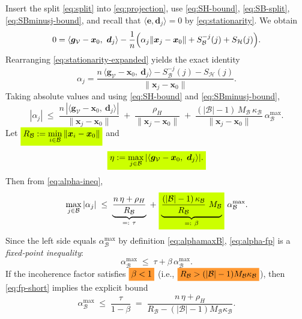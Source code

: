 \documentclass{article}
\theoremstyle{plain}
\theoremstyle{definition}
\theoremstyle{remark}
\begin{document}
Insert the split \eqref{eq:split} into \eqref{eq:projection}, use \eqref{eq:SH-bound}, \eqref{eq:SB-split}, \eqref{eq:SBminusj-bound}, and recall that $\langle \bm{e},\bm{d}_j\rangle=0$ by \eqref{eq:stationarity}.
We obtain
\begin{equation}
0
= \langle \bm{g}_{\mathcal{V}}-\bm{x}_0,\ \bm{d}_j\rangle
- \frac{1}{n}\Bigl( \alpha_j\|\bm{x}_j-\bm{x}_0\| + S_{\mathcal{B}}^{-j}(j) + S_{\mathcal{H}}(j) \Bigr).
\label{eq:stationarity-expanded}
\end{equation}
Rearranging \eqref{eq:stationarity-expanded} yields the exact identity
\begin{equation}
\alpha_j
= \frac{ n\,\langle \bm{g}_{\mathcal{V}}-\bm{x}_0,\ \bm{d}_j\rangle - S_{\mathcal{B}}^{-j}(j) - S_{\mathcal{H}}(j)}{\|\bm{x}_j-\bm{x}_0\|}.
\label{eq:alpha-exact}
\end{equation}
Taking absolute values and using \eqref{eq:SH-bound} and \eqref{eq:SBminusj-bound},
\begin{equation}
|\alpha_j|
\;\le\;
\frac{ n\,|\langle \bm{g}_{\mathcal{V}}-\bm{x}_0,\ \bm{d}_j\rangle|}{\|\bm{x}_j-\bm{x}_0\|}
\;+\;
\frac{ \rho_H }{\|\bm{x}_j-\bm{x}_0\|}
\;+\;
\frac{ (|\mathcal{B}|-1)\,M_{\mathcal{B}}\,\kappa_{\mathcal{B}} }{\|\bm{x}_j-\bm{x}_0\|}\ \alpha^{\max}_{\mathcal{B}} .
\label{eq:alpha-ineq}
\end{equation}
Let
$
  \colorbox{fluor}{%
    $\displaystyle
        R_{\mathcal{B}}:=\min_{i\in \mathcal{B}}\|\bm{x}_i-\bm{x}_0\|
    $%
  }
$
and
\begin{equation}
  \colorbox{fluor}{%
    $\displaystyle
        \eta := \max_{j\in \mathcal{B}} |\langle \bm{g}_{\mathcal{V}}-\bm{x}_0,\ \bm{d}_j\rangle|.
    $%
  }
\label{eq:eta-def}
\end{equation}
Then from \eqref{eq:alpha-ineq},
\begin{equation}
\max_{j\in \mathcal{B}} |\alpha_j|
\;\le\;
\underbrace{\frac{n\,\eta + \rho_H}{R_{\mathcal{B}}}}_{=:~\tau}
\;+\;
  \colorbox{fluor}{%
    $\displaystyle
\underbrace{\frac{(|\mathcal{B}|-1)\,\kappa_{\mathcal{B}}}{R_{\mathcal{B}}}\  M_{\mathcal{B}}}_{=:~\beta}
    $%
  }\  \alpha^{\max}_{\mathcal{B}} .
\label{eq:alpha-fp}
\end{equation}
Since the left side equals $\alpha^{\max}_{\mathcal{B}}$ by definition \eqref{eq:alphamaxB}, \eqref{eq:alpha-fp} is a \emph{fixed‑point inequality}:
\begin{equation}
\alpha^{\max}_{\mathcal{B}} \;\le\; \tau + \beta\,\alpha^{\max}_{\mathcal{B}} .
\label{eq:fp-short}
\end{equation}
If the incoherence factor satisfies 
$
  \colorbox{alert}{%
    $\displaystyle
        \beta<1	
    $%
  }
$
(i.e., 
$
  \colorbox{alert}{%
    $\displaystyle
        R_{\mathcal{B}}>(|\mathcal{B}|-1)M_{\mathcal{B}}\kappa_{\mathcal{B}}	
    $%
  }
$),
then \eqref{eq:fp-short} implies the explicit bound
\begin{equation}
\boxed{\;
\alpha^{\max}_{\mathcal{B}} \;\le\; \frac{\tau}{1-\beta}
\;=\;
\frac{n\,\eta + \rho_H}{R_{\mathcal{B}} - (|\mathcal{B}|-1)M_{\mathcal{B}}\kappa_{\mathcal{B}}}.
\;}
\label{eq:alphamax-final}
\end{equation}
\end{document}
